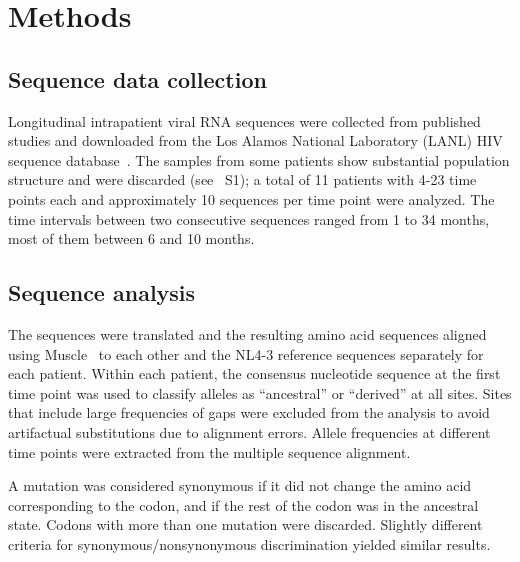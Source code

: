 \documentclass[10pt]{article}
\newcommand{\PCApat}{1}
\begin{document}
\section*{Methods}
\subsection*{Sequence data collection}
Longitudinal intrapatient viral RNA sequences were collected from published
studies \cite{shankarappa_consistent_1999, liu_selection_2006,
bunnik_autologous_2008} and downloaded from the Los Alamos National Laboratory
(LANL) HIV sequence database~\cite{LANL2012}. The samples from some patients
show substantial population structure and were discarded (see
\figurename~S\PCApat); a total of 11 patients with 4-23 time points each and
approximately 10 sequences per time point were analyzed. The time intervals
between two consecutive sequences ranged from 1 to 34 months, most of them
between 6 and 10 months.

\subsection*{Sequence analysis}
The sequences were translated and the resulting amino acid sequences aligned
using Muscle~\cite{edgar_muscle:_2004} to each other and the NL4-3 reference
sequences separately for each patient. Within each patient, the consensus
nucleotide sequence at the first time point was used to classify alleles as
``ancestral'' or ``derived'' at all sites. Sites that include large
frequencies of gaps were excluded from the analysis to avoid artifactual
substitutions due to alignment errors. Allele frequencies at different time
points were extracted from the multiple sequence alignment.

A mutation was considered synonymous if it did not change the amino acid
corresponding to the codon, and if the rest of the codon was in the ancestral
state. Codons with more than one mutation were discarded. Slightly different
criteria for synonymous/nonsynonymous discrimination yielded similar results.

\end{document}
